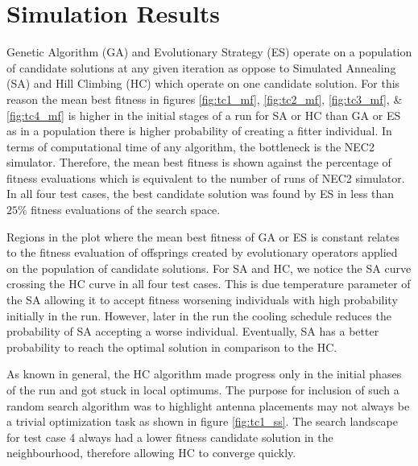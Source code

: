 \documentclass[conference]{IEEEtran}
\begin{document}
\section{Simulation Results}
\label{sec:results}
Genetic Algorithm (GA) and Evolutionary Strategy (ES) operate on a population of candidate solutions at any given iteration as oppose to Simulated Annealing (SA) and Hill Climbing (HC) which operate on one candidate solution. For this reason the mean best fitness in figures \ref{fig:tc1_mf}, \ref{fig:tc2_mf}, \ref{fig:tc3_mf}, \& \ref{fig:tc4_mf} is higher in the initial stages of a run for SA or HC than GA or ES as in a population there is higher probability of creating a fitter individual. In terms of computational time of any algorithm, the bottleneck is the NEC2 simulator. Therefore, the mean best fitness is shown against the percentage of fitness evaluations which is equivalent to the number of runs of NEC2 simulator. In all four test cases, the best candidate solution was found by ES in less than $25\%$ fitness evaluations of the search space. 

Regions in the plot where the mean best fitness of GA or ES is constant relates to the fitness evaluation of offsprings created by evolutionary operators applied on the population of candidate solutions. For SA and HC, we notice the SA curve crossing the HC curve in all four test cases. This is due temperature parameter of the SA allowing it to accept fitness worsening individuals with high probability initially in the run. However, later in the run the cooling schedule reduces the probability of SA accepting a worse individual. Eventually, SA has a better probability to reach the optimal solution in comparison to the HC.

As known in general, the HC algorithm made progress only in the initial phases of the run and got stuck in local optimums. The purpose for inclusion of such a random search algorithm was to highlight antenna placements may not always be a trivial optimization task as shown in figure \ref{fig:tc1_ss}. The search landscape for test case 4 always had a lower fitness candidate solution in the neighbourhood, therefore allowing HC to converge quickly.
\end{document}
